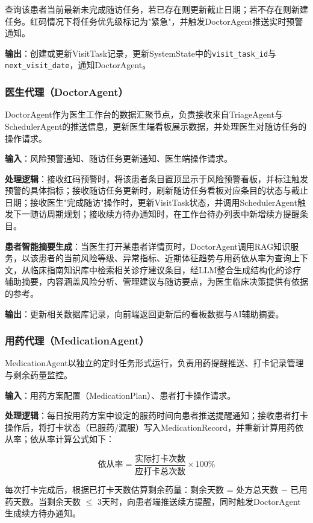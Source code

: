 查询该患者当前最新未完成随访任务，若已存在则更新截止日期；若不存在则新建任务。红码情况下将任务优先级标记为"紧急"，并触发DoctorAgent推送实时预警通知。

\textbf{输出}：创建或更新VisitTask记录，更新SystemState中的\texttt{visit\_task\_id}与\texttt{next\_visit\_date}，通知DoctorAgent。


\subsubsection{医生代理（DoctorAgent）}

DoctorAgent作为医生工作台的数据汇聚节点，负责接收来自TriageAgent与SchedulerAgent的推送信息，更新医生端看板展示数据，并处理医生对随访任务的操作请求。

\textbf{输入}：风险预警通知、随访任务更新通知、医生端操作请求。

\textbf{处理逻辑}：接收红码预警时，将该患者条目置顶显示于风险预警看板，并标注触发预警的具体指标；接收随访任务更新时，刷新随访任务看板对应条目的状态与截止日期；接收医生"完成随访"操作时，更新VisitTask状态，并调用SchedulerAgent触发下一随访周期规划；接收续方待办通知时，在工作台待办列表中新增续方提醒条目。

\textbf{患者智能摘要生成}：当医生打开某患者详情页时，DoctorAgent调用RAG知识服务，以该患者的当前风险等级、异常指标、近期体征趋势与用药依从率为查询上下文，从临床指南知识库中检索相关诊疗建议条目，经LLM整合生成结构化的诊疗辅助摘要，内容涵盖风险分析、管理建议与随访要点，为医生临床决策提供有依据的参考。

\textbf{输出}：更新相关数据库记录，向前端返回更新后的看板数据与AI辅助摘要。


\subsubsection{用药代理（MedicationAgent）}

MedicationAgent以独立的定时任务形式运行，负责用药提醒推送、打卡记录管理与剩余药量监控。

\textbf{输入}：用药方案配置（MedicationPlan）、患者打卡操作请求。

\textbf{处理逻辑}：每日按用药方案中设定的服药时间向患者推送提醒通知；接收患者打卡操作后，将打卡状态（已服药/漏服）写入MedicationRecord，并重新计算用药依从率；依从率计算公式如下：

\[
\text{依从率} = \frac{\text{实际打卡次数}}{\text{应打卡总次数}} \times 100\%
\]

每次打卡完成后，根据已打卡天数估算剩余药量：剩余天数 = 处方总天数 $-$ 已用药天数。当剩余天数 $\leq$ 3天时，向患者端推送续方提醒，同时触发DoctorAgent生成续方待办通知。


